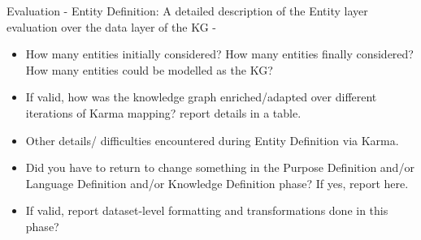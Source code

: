 Evaluation - Entity Definition: A detailed description of the Entity layer evaluation over the data layer of the KG -
\begin{itemize}
    \item How many entities initially considered? How many entities finally considered? How many entities could be modelled as the KG?
    \item If valid, how was the knowledge graph enriched/adapted over different iterations of Karma mapping? report details in a table.
    \item Other details/ difficulties encountered during Entity Definition via Karma.
    \item Did you have to return to change something in the Purpose Definition and/or Language Definition and/or Knowledge Definition phase? If yes, report here.
    \item If valid, report dataset-level formatting and transformations done in this phase?
\end{itemize}